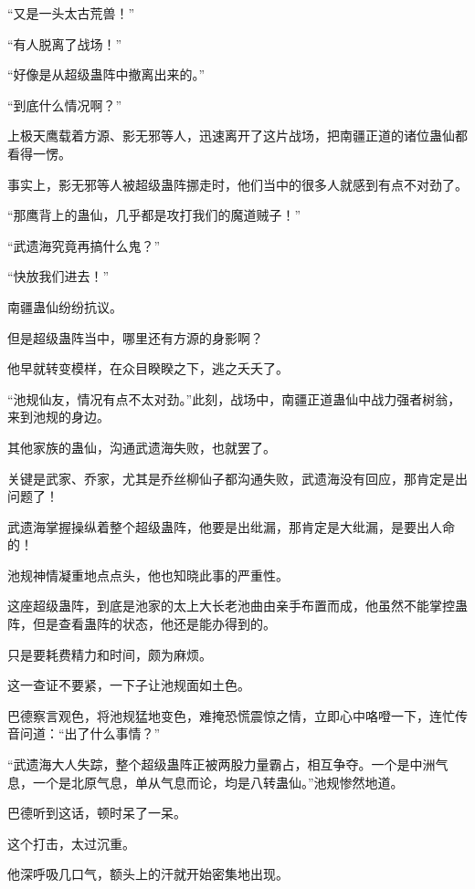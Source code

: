 
\begin{this_body}



“又是一头太古荒兽！”

“有人脱离了战场！”

“好像是从超级蛊阵中撤离出来的。”

“到底什么情况啊？”

上极天鹰载着方源、影无邪等人，迅速离开了这片战场，把南疆正道的诸位蛊仙都看得一愣。

事实上，影无邪等人被超级蛊阵挪走时，他们当中的很多人就感到有点不对劲了。

“那鹰背上的蛊仙，几乎都是攻打我们的魔道贼子！”

“武遗海究竟再搞什么鬼？”

“快放我们进去！”

南疆蛊仙纷纷抗议。

但是超级蛊阵当中，哪里还有方源的身影啊？

他早就转变模样，在众目睽睽之下，逃之夭夭了。

“池规仙友，情况有点不太对劲。”此刻，战场中，南疆正道蛊仙中战力强者树翁，来到池规的身边。

其他家族的蛊仙，沟通武遗海失败，也就罢了。

关键是武家、乔家，尤其是乔丝柳仙子都沟通失败，武遗海没有回应，那肯定是出问题了！

武遗海掌握操纵着整个超级蛊阵，他要是出纰漏，那肯定是大纰漏，是要出人命的！

池规神情凝重地点点头，他也知晓此事的严重性。

这座超级蛊阵，到底是池家的太上大长老池曲由亲手布置而成，他虽然不能掌控蛊阵，但是查看蛊阵的状态，他还是能办得到的。

只是要耗费精力和时间，颇为麻烦。

这一查证不要紧，一下子让池规面如土色。

巴德察言观色，将池规猛地变色，难掩恐慌震惊之情，立即心中咯噔一下，连忙传音问道：“出了什么事情？”

“武遗海大人失踪，整个超级蛊阵正被两股力量霸占，相互争夺。一个是中洲气息，一个是北原气息，单从气息而论，均是八转蛊仙。”池规惨然地道。

巴德听到这话，顿时呆了一呆。

这个打击，太过沉重。

他深呼吸几口气，额头上的汗就开始密集地出现。


\end{this_body}
